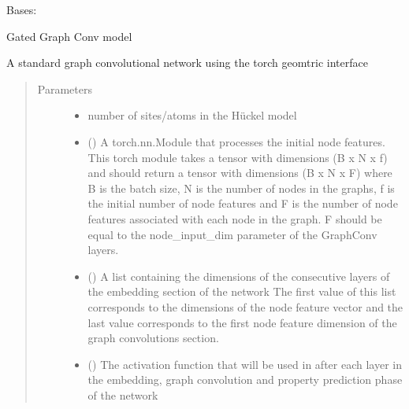 \documentclass[letterpaper,10pt,english]{sphinxmanual}
\begin{document}
\begin{fulllineitems}
\label{\detokenize{modules/gqcml.torchgeom_interface:gqcml.torchgeom_interface.models_3.GatedGraphConv}}
Bases: 

Gated Graph Conv model

A standard graph convolutional network using the torch geomtric interface
\begin{quote}\begin{description}
\item[{Parameters}] \leavevmode\begin{itemize}
\item {} 
 \textendash{} number of sites/atoms in the Hückel model

\item {} 
 () \textendash{} A torch.nn.Module that processes the initial node features. This torch module
takes a tensor with dimensions (B x N x f)  and should return a tensor with
dimensions (B x N x F) where B is the batch size, N is the number of nodes in
the graphs, f is the initial number of node features and F is the number of node features
associated with each node in the graph. F should be equal to the node\_input\_dim
parameter of the GraphConv layers.

\item {} 
 () \textendash{} A list containing the dimensions of the consecutive layers of the embedding section of the network
The first value of this list corresponds to the dimensions of the node feature vector and the last
value corresponds to the first node feature dimension of the graph convolutions section.

\item {} 
 () \textendash{} The activation function that will be used in after each layer in the embedding, graph convolution
and property prediction phase of the network


\end{itemize}
\end{description}
\end{quote}
\end{fulllineitems}
\end{document}
